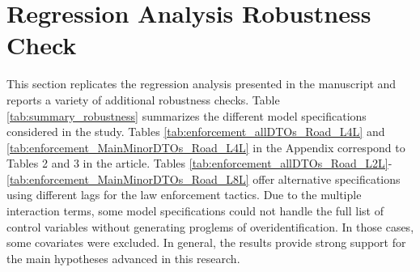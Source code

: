 \documentclass[12pt,letterpaper]{article}
\begin{document}
\clearpage

\section{Regression Analysis Robustness Check}


This section replicates the regression analysis presented in the manuscript and reports a variety of additional robustness checks. Table \ref{tab:summary_robustness} summarizes the different model specifications considered in the study. Tables \ref{tab:enforcement_allDTOs_Road_L4L} and \ref{tab:enforcement_MainMinorDTOs_Road_L4L} in the Appendix correspond to Tables 2 and 3 in the article. Tables \ref{tab:enforcement_allDTOs_Road_L2L}-\ref{tab:enforcement_MainMinorDTOs_Road_L8L} offer alternative specifications using different lags for the law enforcement tactics.  Due to the multiple interaction terms, some model specifications could not handle the full list of control variables without generating proglems of overidentification. In those cases, some covariates were excluded. In general, the results provide strong support for the main hypotheses advanced in this research. \\
\end{document}
